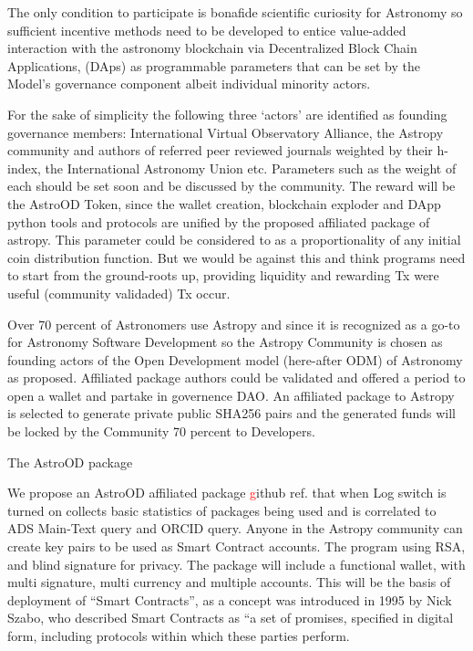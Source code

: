 \documentclass[final,5p,times,twocolumn,authoryear]{elsarticle}
\begin{document}
The only condition to participate is bonafide scientific curiosity for Astronomy so sufficient incentive methods need to be developed to entice value-added interaction with the astronomy blockchain via Decentralized Block Chain Applications, (DAps) as programmable parameters that can be set by the Model's governance component albeit individual minority actors. 

For the sake of simplicity the following three `actors' are identified as founding governance members: International Virtual Observatory Alliance, the  Astropy community and authors of referred peer reviewed journals weighted by their h-index, the International Astronomy Union etc. Parameters such as the weight of each should be set soon and be discussed by the community. The reward will be the AstroOD Token, since the wallet creation, blockchain exploder and DApp python tools and protocols are unified by the proposed affiliated package of astropy. This parameter could be considered to as a proportionality of any initial coin distribution function. But we would be against this and think programs need to start from the ground-roots up, providing liquidity and rewarding Tx were useful (community validaded) Tx occur. 

Over 70 percent of Astronomers use  Astropy and since it is recognized as a go-to for Astronomy Software Development so the Astropy Community is chosen as founding actors of the Open Development model (here-after ODM) of Astronomy as proposed. Affiliated package authors could be validated and offered a period to open a wallet and partake in governence DAO. An affiliated package to Astropy is selected to generate private public SHA256 pairs and the generated funds will be locked by the Community 70 percent to Developers. 

The AstroOD package 

We propose an AstroOD affiliated package \textcolor{red} github ref. that when Log switch is turned on collects basic statistics of packages being used and is correlated to ADS Main-Text query and ORCID query. Anyone in the Astropy community can create key pairs to be used as Smart Contract accounts. The program using RSA, and blind signature for privacy. The package will include a functional wallet, with multi signature, multi currency and multiple accounts. This will be the basis of deployment of “Smart Contracts”, as a concept was introduced in 1995 by Nick Szabo, who described Smart Contracts as “a set of promises,
specified in digital form, including protocols within which these parties perform.
\end{document}

